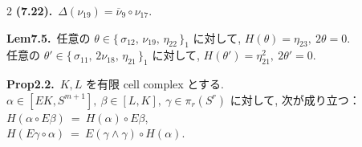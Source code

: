 \documentclass[10pt, leqno]{ltjsarticle}
\newcommand{\todai}[2][]{\{\,#2\,\}_{#1}}      %
\numberwithin{equation}{section}
\theoremstyle{plain}
\theoremstyle{definition}
\theoremstyle{remark}
\begin{document}
\begin{paracol}{2}
\noindent
\textbf{(7.22).}\
\(\Delta(\nu_{19})=\overline{\nu}_{9}\circ\nu_{17}.\)

\noindent
\textbf{Lem7.5.}\
任意の \(\theta\in\todai[1]{\sigma_{12},\,\nu_{19},\,\eta_{22}}\) に対して,
\(H(\theta)=\eta_{23},\ 2\theta=0.\)\\
任意の \(\theta'\in\todai[1]{\sigma_{11},\,2\nu_{18},\,\eta_{21}}\) に対して,
\(H(\theta')=\eta_{21}^{2},\ 2\theta'=0.\)

\noindent
\textbf{Prop2.2.}\
$K,L$ を有限 cell complex とする. \\
$\alpha\in[EK, S^{m+1}], \ \beta\in[L,K], \ \gamma\in\pi_r(S^r)$ 
に対して, 次が成り立つ：\\
\(
H(\alpha\circ E\beta)\ =\ H(\alpha)\circ E\beta,
\)\\
\(
H(E\gamma\circ\alpha)\ =\ E(\gamma\wedge\gamma)\circ H(\alpha).
\)







\end{paracol}
\end{document}
